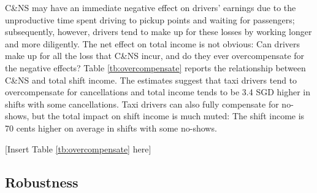 \documentclass[reviewmode,AEJ]{AEA}
\begin{document}
C\&NS may have an immediate negative effect on drivers' earnings due to the 
unproductive time spent driving to pickup points and waiting for passengers; subsequently, however, 
drivers tend to make up for these losses by working longer and more diligently. The net effect on total
income is not obvious: Can drivers make up for all the loss that C\&NS incur, and do they ever 
overcompensate for the negative effects? Table \ref{tb:overcompensate} reports the relationship between 
C\&NS and total shift income.
The estimates suggest that taxi drivers tend to overcompensate for cancellations %
and total income tends to be 3.4 SGD higher in shifts with some cancellations.
Taxi drivers can also fully compensate for no-shows, but the total impact on shift income is much muted:
The shift income is 70 cents higher on average in shifts with some no-shows.

\begin{center}
	[Insert Table \ref{tb:overcompensate} here]
\end{center}



\subsection{Robustness}
\end{document}
